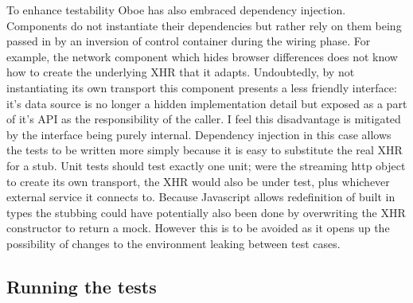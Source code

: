 \documentclass[12pt, ]{article}
\begin{document}
To enhance testability Oboe has also embraced dependency injection.
Components do not instantiate their dependencies but rather rely on them
being passed in by an inversion of control container during the wiring
phase. For example, the network component which hides browser
differences does not know how to create the underlying XHR that it
adapts. Undoubtedly, by not instantiating its own transport this
component presents a less friendly interface: it's data source is no
longer a hidden implementation detail but exposed as a part of it's API
as the responsibility of the caller. I feel this disadvantage is
mitigated by the interface being purely internal. Dependency injection
in this case allows the tests to be written more simply because it is
easy to substitute the real XHR for a stub. Unit tests should test
exactly one unit; were the streaming http object to create its own
transport, the XHR would also be under test, plus whichever external
service it connects to. Because Javascript allows redefinition of built
in types the stubbing could have potentially also been done by
overwriting the XHR constructor to return a mock. However this is to be
avoided as it opens up the possibility of changes to the environment
leaking between test cases.

\subsection{Running the tests}\label{running-the-tests}
\end{document}
